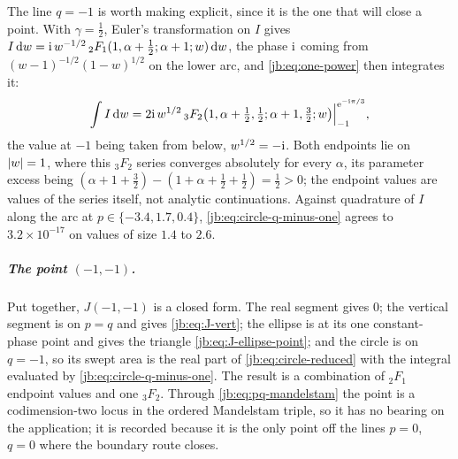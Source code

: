 The line $q = -1$ is worth making explicit, since it is the one that will close a point.
With $\gamma = \tfrac12$, Euler's transformation on $I$ gives
$I \, \mathrm{d} w = \mathrm{i} \, w^{-1/2} \, {}_2F_1(1, \alpha + \tfrac12; \alpha + 1; w) \, \mathrm{d} w$, the phase
$\mathrm{i}$ coming from $(w - 1)^{-1/2} (1 - w)^{1/2}$ on the lower arc, and \eqref{jb:eq:one-power} then
integrates it:
\begin{equation}
  \label{jb:eq:circle-q-minus-one}
  \int I \, \mathrm{d} w
    = 2 \mathrm{i} \, w^{1/2} \,
      {}_3F_2 \bigl( 1, \alpha + \tfrac12, \tfrac12; \alpha + 1, \tfrac32; w \bigr)
      \Big|_{-1}^{\mathrm{e}^{- \mathrm{i} \pi/3}},
\end{equation}
the value at $-1$ being taken from below, $w^{1/2} = - \mathrm{i}$.
Both endpoints lie on ${|w|} = 1$, where this ${}_3F_2$ series converges absolutely for every
$\alpha$, its parameter excess being
$(\alpha + 1 + \tfrac32) - (1 + \alpha + \tfrac12 + \tfrac12) = \tfrac12 > 0$; the endpoint values
are values of the series itself, not analytic continuations.
Against quadrature of $I$ along the arc at $p \in \{-3.4, 1.7, 0.4\}$,
\eqref{jb:eq:circle-q-minus-one} agrees to $3.2 \times 10^{-17}$ on values of size $1.4$ to $2.6$.

\subparagraph{The point $(-1, -1)$.}
Put together, $J(-1, -1)$ is a closed form.
The real segment gives $0$; the vertical segment is on $p = q$ and gives \eqref{jb:eq:J-vert}; the
ellipse is at its one constant-phase point and gives the triangle \eqref{jb:eq:J-ellipse-point}; and
the circle is on $q = -1$, so its swept area is the real part of \eqref{jb:eq:circle-reduced} with the
integral evaluated by \eqref{jb:eq:circle-q-minus-one}.
The result is a combination of ${}_2F_1$ endpoint values and one ${}_3F_2$.
Through \eqref{jb:eq:pq-mandelstam} the point is a codimension-two locus in the ordered Mandelstam
triple, so it has no bearing on the application;
it is recorded because it is the only point off the lines $p = 0$, $q = 0$ where the boundary
route closes.

